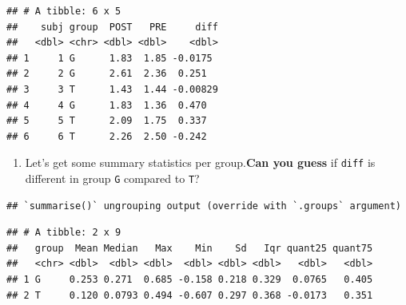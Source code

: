 \documentclass[
]{book}
\newenvironment{Shaded}{\begin{snugshade}}{\end{snugshade}}
\newcommand{\CommentTok}[1]{\textcolor[rgb]{0.56,0.35,0.01}{\textit{#1}}}
\newcommand{\DataTypeTok}[1]{\textcolor[rgb]{0.13,0.29,0.53}{#1}}
\newcommand{\FloatTok}[1]{\textcolor[rgb]{0.00,0.00,0.81}{#1}}
\newcommand{\KeywordTok}[1]{\textcolor[rgb]{0.13,0.29,0.53}{\textbf{#1}}}
\newcommand{\NormalTok}[1]{#1}
\newcommand{\OperatorTok}[1]{\textcolor[rgb]{0.81,0.36,0.00}{\textbf{#1}}}
\newcommand{\StringTok}[1]{\textcolor[rgb]{0.31,0.60,0.02}{#1}}
\providecommand{\tightlist}{%
  \setlength{\itemsep}{0pt}\setlength{\parskip}{0pt}}
\begin{document}
\begin{verbatim}
## # A tibble: 6 x 5
##    subj group  POST   PRE     diff
##   <dbl> <chr> <dbl> <dbl>    <dbl>
## 1     1 G      1.83  1.85 -0.0175 
## 2     2 G      2.61  2.36  0.251  
## 3     3 T      1.43  1.44 -0.00829
## 4     4 G      1.83  1.36  0.470  
## 5     5 T      2.09  1.75  0.337  
## 6     6 T      2.26  2.50 -0.242
\end{verbatim}

\begin{enumerate}
\def\labelenumi{\arabic{enumi}.}
\setcounter{enumi}{6}
\tightlist
\item
  Let's get some summary statistics per group.\textbf{Can you guess} if \texttt{diff} is different in group \texttt{G} compared to \texttt{T}?
\end{enumerate}

\begin{Shaded}
\end{Shaded}

\begin{verbatim}
## `summarise()` ungrouping output (override with `.groups` argument)
\end{verbatim}

\begin{verbatim}
## # A tibble: 2 x 9
##   group  Mean Median   Max    Min    Sd   Iqr quant25 quant75
##   <chr> <dbl>  <dbl> <dbl>  <dbl> <dbl> <dbl>   <dbl>   <dbl>
## 1 G     0.253 0.271  0.685 -0.158 0.218 0.329  0.0765   0.405
## 2 T     0.120 0.0793 0.494 -0.607 0.297 0.368 -0.0173   0.351
\end{verbatim}
\end{document}
